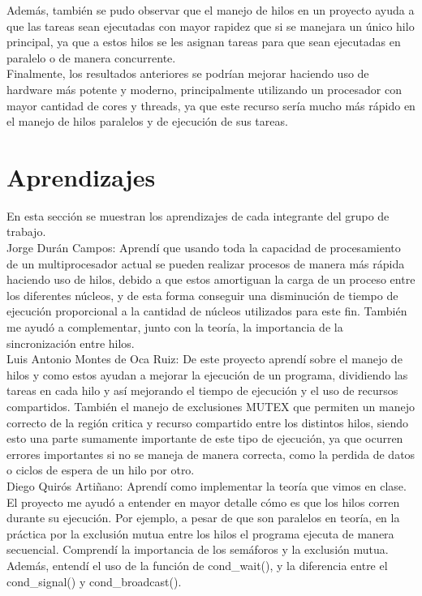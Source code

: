 \documentclass[10pt, article, natbib]{IEEEtran}
\begin{document}
Además, también se pudo observar que el manejo de hilos en un proyecto ayuda a que las tareas sean ejecutadas con mayor rapidez que si se manejara un único hilo principal, ya que a estos hilos se les asignan tareas para que sean ejecutadas en paralelo o de manera concurrente.\cite{portfoliocourses_2022_introduction} \\

Finalmente, los resultados anteriores se podrían mejorar haciendo uso de hardware más potente y moderno, principalmente utilizando un procesador con mayor cantidad de cores y threads, ya que este recurso sería mucho más rápido en el manejo de hilos paralelos y de ejecución de sus tareas.\\

\section{Aprendizajes}
En esta sección se muestran los aprendizajes de cada integrante del grupo de trabajo.\\

Jorge Durán Campos: Aprendí que usando toda la capacidad de procesamiento de un multiprocesador actual se pueden realizar procesos de manera más rápida haciendo uso de hilos, debido a que estos amortiguan la carga de un proceso entre los diferentes núcleos, y de esta forma conseguir una disminución de tiempo de ejecución proporcional a la cantidad de núcleos utilizados para este fin. También me ayudó a complementar, junto con la teoría, la importancia de la sincronización entre hilos.\\

Luis Antonio Montes de Oca Ruiz: De este proyecto aprendí sobre el manejo de hilos y como estos ayudan a mejorar la ejecución de un programa, dividiendo las tareas en cada hilo y así mejorando el tiempo de ejecución y el uso de recursos compartidos. También el manejo de exclusiones MUTEX que permiten un manejo correcto de la región critica y recurso compartido entre los distintos hilos, siendo esto una parte sumamente importante de este tipo de ejecución, ya que ocurren errores importantes si no se maneja de manera correcta, como la perdida de datos o ciclos de espera de un hilo por otro.\\

Diego Quirós Artiñano: Aprendí como implementar la teoría que vimos en clase. El proyecto me ayudó a entender en mayor detalle cómo es que los hilos corren durante su ejecución. Por ejemplo, a pesar de que son paralelos en teoría, en la práctica por la exclusión mutua entre los hilos el programa ejecuta de manera secuencial. Comprendí la importancia de los semáforos y la exclusión mutua. Además, entendí el uso de la función de cond\_wait(), y la diferencia entre el cond\_signal() y cond\_broadcast().\\

\newpage
\onecolumn
 

\end{document}
